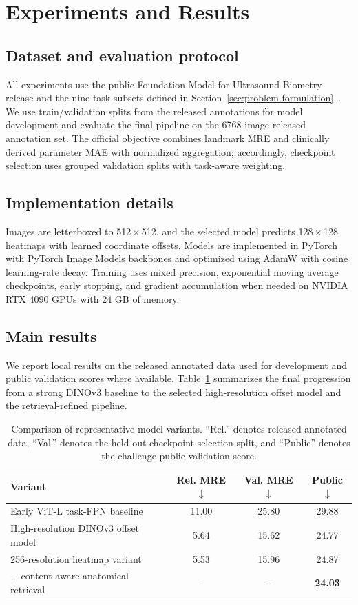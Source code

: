 \documentclass[runningheads]{llncs}
\begin{document}
\section{Experiments and Results}
\subsection{Dataset and evaluation protocol}
All experiments use the public Foundation Model for Ultrasound Biometry release and the nine task subsets defined in Section~\ref{sec:problem-formulation}~\cite{mwm2026,fubiometrychallenge,fubiometrybaseline}. We use train/validation splits from the released annotations for model development and evaluate the final pipeline on the 6768-image released annotation set. The official objective combines landmark MRE and clinically derived parameter MAE with normalized aggregation; accordingly, checkpoint selection uses grouped validation splits with task-aware weighting.

\subsection{Implementation details}
Images are letterboxed to 512\,$\times$\,512, and the selected model predicts 128\,$\times$\,128 heatmaps with learned coordinate offsets. Models are implemented in PyTorch with PyTorch Image Models backbones and optimized using AdamW with cosine learning-rate decay. Training uses mixed precision, exponential moving average checkpoints, early stopping, and gradient accumulation when needed on NVIDIA RTX 4090 GPUs with 24 GB of memory.

\subsection{Main results}
We report local results on the released annotated data used for development and public validation scores where available. Table~\ref{tab:main-results} summarizes the final progression from a strong DINOv3 baseline to the selected high-resolution offset model and the retrieval-refined pipeline.

\begin{table}[t]
  \centering
  \caption{Comparison of representative model variants. ``Rel.'' denotes released annotated data, ``Val.'' denotes the held-out checkpoint-selection split, and ``Public'' denotes the challenge public validation score.}
  \label{tab:main-results}
  \small
  \setlength{\tabcolsep}{3pt}
  \begin{tabular}{lccc}
    \toprule
    Variant & Rel. MRE$\downarrow$ & Val. MRE$\downarrow$ & Public$\downarrow$ \\
    \midrule
    Early ViT-L task-FPN baseline & 11.00 & 25.80 & 29.88 \\
    High-resolution DINOv3 offset model & 5.64 & 15.62 & 24.77 \\
    256-resolution heatmap variant & 5.53 & 15.96 & 24.87 \\
    + content-aware anatomical retrieval & -- & -- & \textbf{24.03} \\
    \bottomrule
  \end{tabular}
\end{table}
\end{document}
